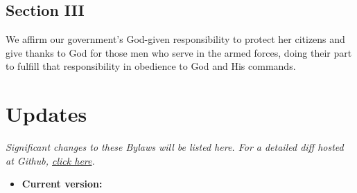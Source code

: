 \documentclass[
]{book}
\providecommand{\tightlist}{%
  \setlength{\itemsep}{0pt}\setlength{\parskip}{0pt}}
\begin{document}
\hypertarget{section-iii}{%
\section{Section III}\label{section-iii}}

We affirm our government's God-given responsibility to protect her citizens and give thanks to God for those men who serve in the armed forces, doing their part to fulfill that responsibility in obedience to God and His commands.

\hypertarget{updates}{%
\chapter*{Updates}\label{updates}}

\emph{Significant changes to these Bylaws will be listed here. For a detailed diff hosted at Github, \href{https://github.com/Trinity-Reformed-Church/trc-bylaws}{click here}.}

\begin{itemize}
\tightlist
\item
  \textbf{Current version:}
\end{itemize}
\end{document}

